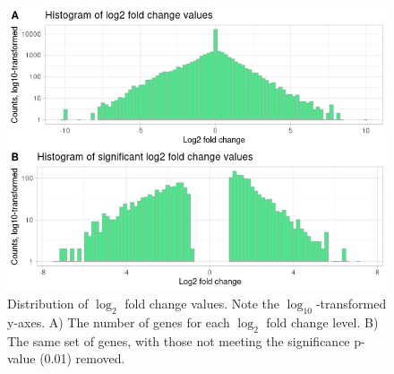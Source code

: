 \documentclass{article}
\begin{document}
\begin{figure}[p]
    \centering
    \includegraphics[width=\textwidth]{plots/log2fc.png}
    \caption{Distribution of $\log_2$ fold change values. Note the $\log_{10}$-transformed y-axes. A) The number of genes for each $\log_2$ fold change level. B) The same set of genes, with those not meeting the significance p-value (0.01) removed.}
    \label{fig:log2fc}
\end{figure}
\end{document}
